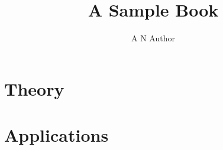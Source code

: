 \documentclass[a4paper,openany, 12pt]{book}
\title{A Sample Book}
\author{A N Author}
\begin{document}
\frontmatter
\maketitle
\tableofcontents






\mainmatter



\part{Theory}


\part{Applications}



\appendix

\end{document}
